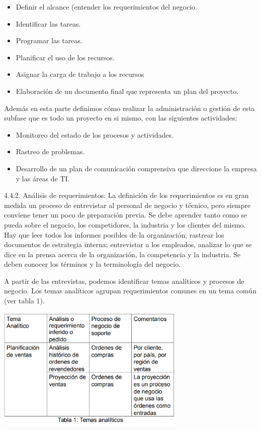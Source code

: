 \documentclass[%
 reprint,
 amsmath,amssymb,
 aps,
]{revtex4-1}
\begin{document}
\begin{itemize}
	\item Definir el alcance (entender los requerimientos del negocio.
	\item Identificar las tareas.
	\item Programar las tareas.
	\item Planificar el uso de los recursos.
	\item Asignar la carga de trabajo a los recursos
	\item Elaboración de un documento final que representa un plan del proyecto.
\end{itemize}
Además en esta parte definimos cómo realizar la administración o gestión de esta subfase que es todo un proyecto en si mismo, con las siguientes actividades: 

\begin{itemize}
	\item Monitoreo del estado de los procesos y actividades.
	\item Rastreo de problemas.
	\item Desarrollo de un plan de comunicación comprensiva que direccione la empresa y las áreas de TI.
\end{itemize}

4.4.2. Análisis de requerimientos:
La definición de los requerimientos es en gran medida un proceso de entrevistar al personal de negocio y técnico, pero siempre conviene tener un poco de preparación previa. Se debe aprender tanto como se pueda sobre el negocio, los competidores, la industria y los clientes del mismo. Hay que leer todos los informes posibles de la organización; rastrear los documentos de estrategia interna; entrevistar a los empleados, analizar lo que se dice en la prensa acerca de la organización, la competencia y la industria. Se deben conocer los términos y la terminología del negocio. 

A partir de las entrevistas, podemos identificar temas analíticos y procesos de negocio. Los temas analíticos agrupan requerimientos
comunes en un tema común (ver tabla 1).
	            \begin{center}
					\includegraphics[width=9cm]{./IMAGENES/img02}
				\end{center}
\end{document}
